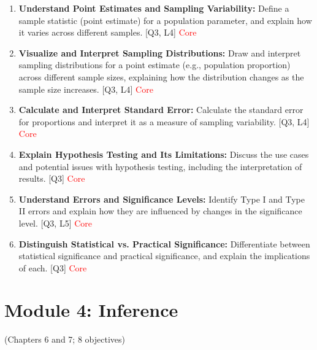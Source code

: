 \documentclass[12pt]{article}
\begin{document}
\begin{enumerate}
    \item \textbf{Understand Point Estimates and Sampling Variability:} Define a sample statistic (point estimate) for a population parameter, and explain how it varies across different samples. [Q3, L4] \textcolor{red}{Core} 
    \item \textbf{Visualize and Interpret Sampling Distributions:} Draw and interpret sampling distributions for a point estimate (e.g., population proportion) across different sample sizes, explaining how the distribution changes as the sample size increases. [Q3, L4] \textcolor{red}{Core}
    \item \textbf{Calculate and Interpret Standard Error:} Calculate the standard error for proportions and interpret it as a measure of sampling variability. [Q3, L4] \textcolor{red}{Core}
    \item \textbf{Explain Hypothesis Testing and Its Limitations:} Discuss the use cases and potential issues with hypothesis testing, including the interpretation of results. [Q3] \textcolor{red}{Core}
    \item \textbf{Understand Errors and Significance Levels:} Identify Type I and Type II errors and explain how they are influenced by changes in the significance level. [Q3, L5] \textcolor{red}{Core}
    \item \textbf{Distinguish Statistical vs. Practical Significance:} Differentiate between statistical significance and practical significance, and explain the implications of each. [Q3] \textcolor{red}{Core}
\end{enumerate}

\newpage


\section{Module 4: Inference}
(Chapters 6 and 7; 8 objectives)

\end{document}
